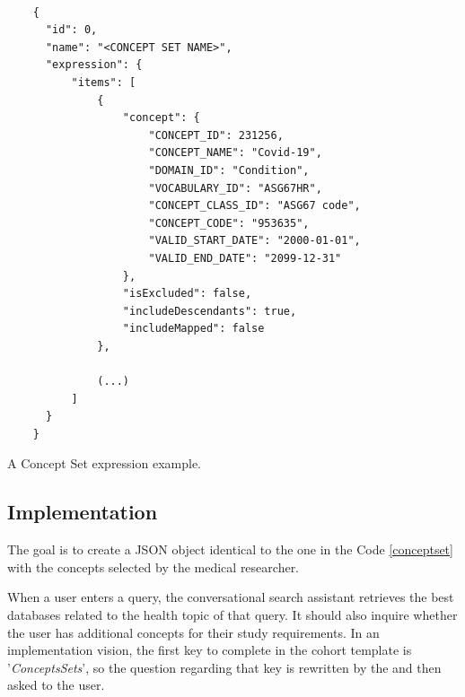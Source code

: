\begin{listing}[H]
  \begin{verbatim}
      
    {
      "id": 0,
      "name": "<CONCEPT SET NAME>",
      "expression": {
          "items": [
              {
                  "concept": {
                      "CONCEPT_ID": 231256,
                      "CONCEPT_NAME": "Covid-19",
                      "DOMAIN_ID": "Condition",
                      "VOCABULARY_ID": "ASG67HR",
                      "CONCEPT_CLASS_ID": "ASG67 code",
                      "CONCEPT_CODE": "953635",
                      "VALID_START_DATE": "2000-01-01",
                      "VALID_END_DATE": "2099-12-31"
                  },
                  "isExcluded": false,
                  "includeDescendants": true,
                  "includeMapped": false
              },
              
              (...)
          ]
      }
    }

  \end{verbatim}
\caption{A Concept Set expression example.}
\label{conceptset}
\end{listing}  



\subsection{Implementation}




The goal is to create a JSON object identical to the one in the Code \ref{conceptset} with the concepts selected by the medical researcher.

When a user enters a query, the conversational search assistant retrieves the best databases related to the health topic of that query. It should also inquire whether the user has additional concepts for their study requirements. In an implementation vision, the first key to complete in the cohort template is '\textit{ConceptsSets}', so the question regarding that key is rewritten by the {\llm} and then asked to the user.

